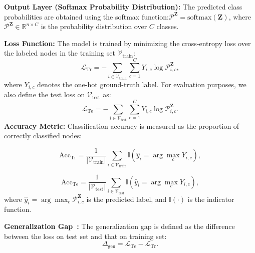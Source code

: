 \noindent\textbf{Output Layer (Softmax Probability Distribution):}  
The predicted class probabilities are obtained using the softmax function:$\mathcal{P}^{\mathbf{Z}} = \text{softmax}(\mathbf{Z})$, where $\mathcal{P}^{\mathbf{Z}} \in \mathbb{R}^{n \times C}$ is the probability distribution over $C$ classes.


\noindent\textbf{Loss Function:}  
The model is trained by minimizing the cross-entropy loss over the labeled nodes in the training set $\mathcal{V}_{\text{train}}$:  
\begin{equation}
    \mathcal{L}_{\text{Tr}} = - \sum_{i \in \mathcal{V}_{\text{train}}} \sum_{c=1}^{C} Y_{i,c} \log \mathcal{P}_{i,c}^{\mathbf{Z}},
\end{equation}
where $Y_{i,c}$ denotes the one-hot ground-truth label. For evaluation purposes, we also define the test loss on $\mathcal{V}_{\text{test}}$ as:  
\begin{equation}
    \mathcal{L}_{\text{Te}} = - \sum_{i \in \mathcal{V}_{\text{test}}} \sum_{c=1}^{C} Y_{i,c} \log \mathcal{P}_{i,c}^{\mathbf{Z}}.
\end{equation}
\noindent\textbf{Accuracy Metric:}  
Classification accuracy is measured as the proportion of correctly classified nodes: 

\begin{equation}
    \text{Acc}_{\text{Tr}} = \frac{1}{|\mathcal{V}_{\text{train}}|} \sum_{i \in \mathcal{V}_{\text{train}}} \mathbb{I}(\hat{y}_i = \arg\max_c Y_{i,c}),
\end{equation}

\begin{equation}
    \text{Acc}_{\text{Te}} = \frac{1}{|\mathcal{V}_{\text{test}}|} \sum_{i \in \mathcal{V}_{\text{test}}} \mathbb{I}(\hat{y}_i = \arg\max_c Y_{i,c}),
\end{equation}
where $\hat{y}_i = \arg\max_c \mathcal{P}_{i,c}^{\mathbf{Z}}$ is the predicted label, and $\mathbb{I}(\cdot)$ is the indicator function.

\noindent\textbf{Generalization Gap~\cite{neyshabur2017exploring}:}  
 The generalization gap is defined as the difference between the loss on test set and that on training set:
\[
\Delta_{\text{gen}} = \mathcal{L}_{\text{Te}} - \mathcal{L}_{\text{Tr}}.
\]

